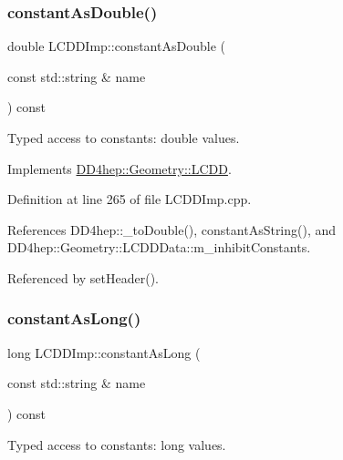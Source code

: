 \subsubsection{\texorpdfstring{constant\+As\+Double()}{constantAsDouble()}}
{\footnotesize\ttfamily double L\+C\+D\+D\+Imp\+::constant\+As\+Double (\begin{DoxyParamCaption}\item[{const std\+::string \&}]{name }\end{DoxyParamCaption}) const\hspace{0.3cm}{\ttfamily [virtual]}}



Typed access to constants\+: double values. 



Implements \hyperlink{class_d_d4hep_1_1_geometry_1_1_l_c_d_d_a9696a0bb5af8abd3667460a617d4dc83}{D\+D4hep\+::\+Geometry\+::\+L\+C\+DD}.



Definition at line 265 of file L\+C\+D\+D\+Imp.\+cpp.



References D\+D4hep\+::\+\_\+to\+Double(), constant\+As\+String(), and D\+D4hep\+::\+Geometry\+::\+L\+C\+D\+D\+Data\+::m\+\_\+inhibit\+Constants.



Referenced by set\+Header().

\hypertarget{class_d_d4hep_1_1_geometry_1_1_l_c_d_d_imp_a0cfd631c5633b9296724984af3033a86}{}\label{class_d_d4hep_1_1_geometry_1_1_l_c_d_d_imp_a0cfd631c5633b9296724984af3033a86} 
\subsubsection{\texorpdfstring{constant\+As\+Long()}{constantAsLong()}}
{\footnotesize\ttfamily long L\+C\+D\+D\+Imp\+::constant\+As\+Long (\begin{DoxyParamCaption}\item[{const std\+::string \&}]{name }\end{DoxyParamCaption}) const\hspace{0.3cm}{\ttfamily [virtual]}}



Typed access to constants\+: long values. 



